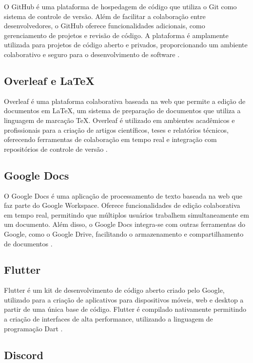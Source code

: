 O GitHub é uma plataforma de hospedagem de código que utiliza o Git como sistema de controle de versão. Além de facilitar a colaboração entre desenvolvedores, o GitHub oferece funcionalidades adicionais, como gerenciamento de projetos e revisão de código. A plataforma é amplamente utilizada para projetos de código aberto e privados, proporcionando um ambiente colaborativo e seguro para o desenvolvimento de software \cite{github2025}.

\subsection{Overleaf e LaTeX}

Overleaf é uma plataforma colaborativa baseada na web que permite a edição de documentos em LaTeX, um sistema de preparação de documentos que utiliza a linguagem de marcação TeX. Overleaf é utilizado em ambientes acadêmicos e profissionais para a criação de artigos científicos, teses e relatórios técnicos, oferecendo ferramentas de colaboração em tempo real e integração com repositórios de controle de versão \cite{overleaf2025}.

\subsection{Google Docs}

O Google Docs é uma aplicação de processamento de texto baseada na web que faz parte do Google Workspace. Oferece funcionalidades de edição colaborativa em tempo real, permitindo que múltiplos usuários trabalhem simultaneamente em um documento. Além disso, o Google Docs integra-se com outras ferramentas do Google, como o Google Drive, facilitando o armazenamento e compartilhamento de documentos \cite{docs2025}.

\subsection{Flutter}

Flutter é um kit de desenvolvimento de código aberto criado pelo Google, utilizado para a criação de aplicativos para dispositivos móveis, web e desktop a partir de uma única base de código. Flutter é compilado nativamente permitindo a criação de interfaces de alta performance, utilizando a linguagem de programação Dart \cite{flutter2025}.

\subsection{Discord}

